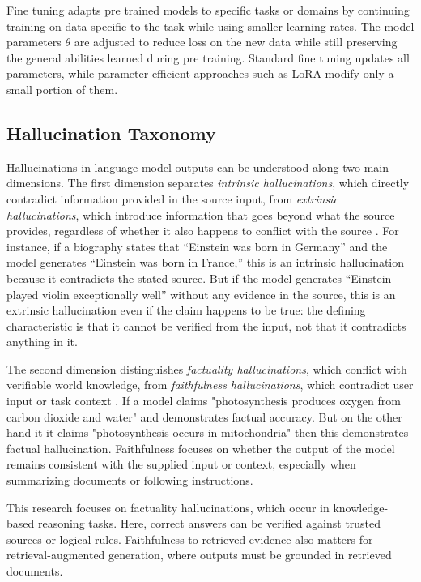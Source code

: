 Fine tuning adapts pre trained models to specific tasks or domains by continuing training on data specific to the task while using smaller learning rates. The model parameters $\theta$ are adjusted to reduce loss on the new data while still preserving the general abilities learned during pre training. Standard fine tuning updates all parameters, while parameter efficient approaches such as LoRA modify only a small portion of them.

\subsection{Hallucination Taxonomy}

Hallucinations in language model outputs can be understood along two main dimensions. The first dimension separates \textit{intrinsic hallucinations}, which directly contradict information provided in the source input, from \textit{extrinsic hallucinations}, which introduce information that goes beyond what the source provides, regardless of whether it also happens to conflict with the source \cite{ji2023survey}. For instance, if a biography states that ``Einstein was born in Germany'' and the model generates ``Einstein was born in France,'' this is an intrinsic hallucination because it contradicts the stated source. But if the model generates ``Einstein played violin exceptionally well'' without any evidence in the source, this is an extrinsic hallucination even if the claim happens to be true: the defining characteristic is that it cannot be verified from the input, not that it contradicts anything in it.

The second dimension distinguishes \textit{factuality hallucinations}, which conflict with verifiable world knowledge, from \textit{faithfulness hallucinations}, which contradict user input or task context \cite{10.1145/3649506}. If a model claims "photosynthesis produces oxygen from carbon dioxide and water" and demonstrates factual accuracy. But on the other hand it it claims "photosynthesis occurs in mitochondria" then this demonstrates factual hallucination. Faithfulness focuses on whether the output of the model remains consistent with the supplied input or context, especially when summarizing documents or following instructions.

This research focuses on factuality hallucinations, which occur in knowledge-based reasoning tasks. Here, correct answers can be verified against trusted sources or logical rules. Faithfulness to retrieved evidence also matters for retrieval-augmented generation, where outputs must be grounded in retrieved documents.

